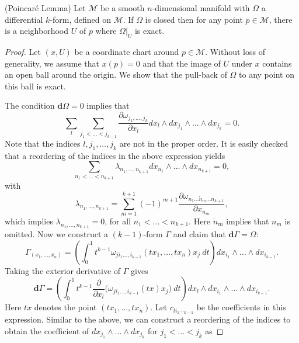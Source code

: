 \begin{theorem} \label{theorem:2.4}
(Poincar\'e Lemma) Let $\mathcal M$ be a smooth $n$-dimensional manifold with $\Omega$ a differential $k$-form, defined on $\mathcal M$. If $\Omega$ is closed then for any point $p\in \mathcal M$, there is a neighborhood $U$ of $p$ where $\Omega|_{U}$ is exact.
\end{theorem}

\begin{proof}
Let $(x,U)$ be a coordinate chart around $p\in \mathcal M$. Without loss of generality, we assume that $x(p)=0$ and that the image of $U$ under $x$ contains an open ball around the origin. We show that the pull-back of $\Omega$ to any point on this ball is exact.

The condition $\mathbf d \Omega = 0$ implies that
\begin{equation*}
	\sum_l \sum_{j_1<\dots<j_{k-1}} \frac{\partial \omega_{j_1,\dots,j_k}}{\partial x_l} dx_l\wedge dx_{j_1}\wedge \dots \wedge dx_{j_k} = 0.
\end{equation*}
Note that the indices $l,j_1,\dots,j_k$ are not in the proper order. It is easily checked that a reordering of the indices in the above expression yields
\begin{equation*}
	\sum_{n_1<\dots<n_{k+1}}\lambda_{n_1,\dots,n_{k+1}} dx_{n_1}\wedge \dots \wedge dx_{n_{k+1}} = 0,
\end{equation*}
with
\begin{equation*}
	\lambda_{n_1,\dots,n_{k+1}} = \sum_{m=1}^{k+1} (-1)^{m+1} \frac{\partial \omega_{n_1\dots\mathring n_m \dots n_{k+1}}}{\partial x_{n_m}},
\end{equation*}
which implies $\lambda_{n_1,\dots,n_{k+1}} = 0$, for all $n_1<\dots<n_{k+1}$. Here $\mathring n_m$ implies that $n_m$ is omitted. Now we construct a $(k-1)$-form $\Gamma$ and claim that $\mathbf d \Gamma = \Omega$:
\begin{equation*}
	\Gamma_{(x_1,\dots,x_n)} = \left( \int_0^1 t^{k-1} \omega_{ji_1\dots,i_{k-1}}(tx_1,\dots,tx_n) x_j \ dt \right) dx_{i_1}\wedge \dots \wedge dx_{i_{k-1}}.
\end{equation*}
Taking the exterior derivative of $\Gamma$ gives
\begin{equation*}
	\mathbf d \Gamma = \left( \int_0^1 t^{k-1} \frac{\partial }{\partial x_l} \big( \omega_{ji_1\dots,i_{k-1}}(tx) x_j \big) \ dt \right) dx_l\wedge dx_{i_1}\wedge \dots \wedge dx_{i_{k-1}}.
\end{equation*}
Here $tx$ denotes the point $(tx_1,\dots,tx_n)$. Let $c_{li_1\dotsi_{k-1}}$ be the coefficients in this expression. Similar to the above, we can construct a reordering of the indices to obtain the coefficient of $dx_{j_1}\wedge\dots\wedge dx_{j_k}$ for $j_1<\dots<j_{k}$ as

\end{proof}
